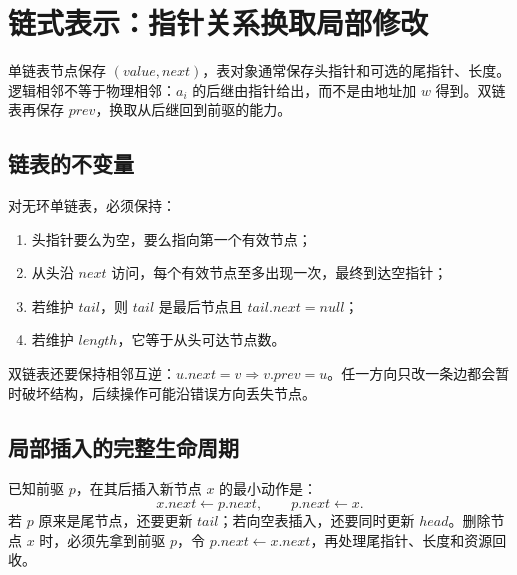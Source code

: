 \documentclass[UTF8,fontset=none,11pt,a4paper]{ctexart}
\begin{document}
\section{链式表示：指针关系换取局部修改}
单链表节点保存 $(value,next)$，表对象通常保存头指针和可选的尾指针、长度。逻辑相邻不等于物理相邻：$a_i$ 的后继由指针给出，而不是由地址加 $w$ 得到。双链表再保存 $prev$，换取从后继回到前驱的能力。

\subsection{链表的不变量}
对无环单链表，必须保持：
\begin{enumerate}
\item 头指针要么为空，要么指向第一个有效节点；
\item 从头沿 $next$ 访问，每个有效节点至多出现一次，最终到达空指针；
\item 若维护 $tail$，则 $tail$ 是最后节点且 $tail.next=null$；
\item 若维护 $length$，它等于从头可达节点数。
\end{enumerate}
双链表还要保持相邻互逆：$u.next=v\Rightarrow v.prev=u$。任一方向只改一条边都会暂时破坏结构，后续操作可能沿错误方向丢失节点。

\subsection{局部插入的完整生命周期}
已知前驱 $p$，在其后插入新节点 $x$ 的最小动作是：
\[
x.next\leftarrow p.next,\qquad p.next\leftarrow x.
\]
若 $p$ 原来是尾节点，还要更新 $tail$；若向空表插入，还要同时更新 $head$。删除节点 $x$ 时，必须先拿到前驱 $p$，令 $p.next\leftarrow x.next$，再处理尾指针、长度和资源回收。
\end{document}
